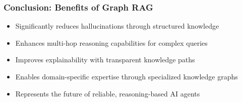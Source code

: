 \begin{frame}[fragile]\frametitle{Conclusion: Benefits of Graph RAG}
      \begin{itemize}
        \item Significantly reduces hallucinations through structured knowledge
        \item Enhances multi-hop reasoning capabilities for complex queries
        \item Improves explainability with transparent knowledge paths
        \item Enables domain-specific expertise through specialized knowledge graphs
        \item Represents the future of reliable, reasoning-based AI agents
      \end{itemize}
\end{frame}








